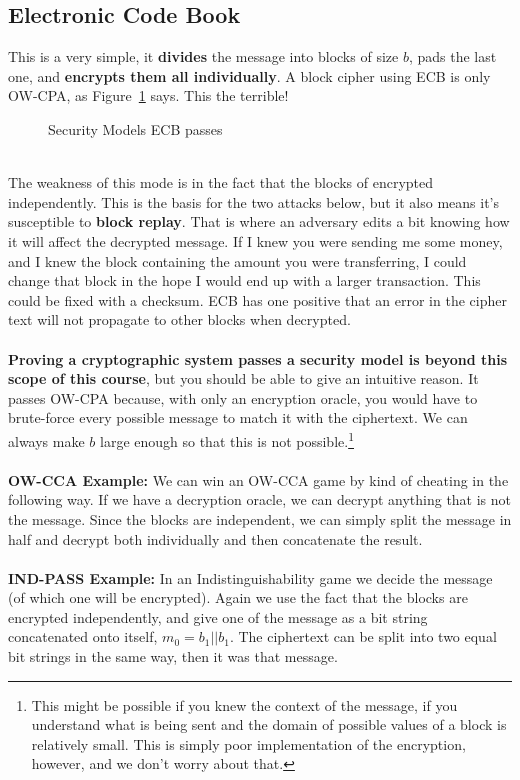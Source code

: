    \subsection{Electronic Code Book}
    This is a very simple, it \textbf{divides} the message into blocks of size $b$, pads the last one, and \textbf{encrypts them all individually}. A block cipher using ECB is only OW-CPA, as Figure~\ref{fig:ecb-attacktable} says. This the terrible!\\
    \begin{figure}[htp!]
    \centering
    \caption{Security Models ECB passes}
    \label{fig:ecb-attacktable}
    \end{figure}
    \\
    The weakness of this mode is in the fact that the blocks of encrypted independently. This is the basis for the two attacks below, but it also means it's susceptible to \textbf{block replay}. That is where an adversary edits a bit knowing how it will affect the decrypted message. If I knew you were sending me some money, and I knew the block containing the amount you were transferring, I could change that block in the hope I would end up with a larger transaction. This could be fixed with a checksum. ECB has one positive that an error in the cipher text will not propagate to other blocks when decrypted.\\
    \\
    \textbf{Proving a cryptographic system passes a security model is beyond this scope of this course}, but you should be able to give an intuitive reason. It passes OW-CPA because, with only an encryption oracle, you would have to brute-force every possible message to match it with the ciphertext. We can always make $b$ large enough so that this is not possible.\footnote{This might be possible if you knew the context of the message, if you understand what is being sent and the domain of possible values of a block is relatively small. This is simply poor implementation of the encryption, however, and we don't worry about that.}\\
    \\
    \textbf{OW-CCA Example:} We can win an OW-CCA game by kind of cheating in the following way. If we have a decryption oracle, we can decrypt anything that is not the message. Since the blocks are independent, we can simply split the message in half and decrypt both individually and then concatenate the result.\\
    \\
    \textbf{IND-PASS Example:} In an Indistinguishability game we decide the message (of which one will be encrypted). Again we use the fact that the blocks are encrypted independently, and give one of the message as a bit string concatenated onto itself, $m_0=b_1||b_1$. The ciphertext can be split into two equal bit strings in the same way, then it was that message.
    
